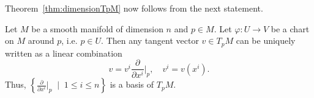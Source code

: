 Theorem~\ref{thm:dimensionTpM} now follows from the next statement.

\begin{proposition}\label{prop:basis_TpM}
	Let $M$ be a smooth manifold of dimension $n$ and $p\in M$.
	Let $\varphi: U \to V$ be a chart on $M$ around $p$, i.e. $p\in U$.
	Then any tangent vector $v\in T_p M$ can be uniquely written as a linear combination
	\begin{equation}
		v = v^i \frac{\partial}{\partial x^i}\Big|_p, \quad v^i = v(x^i).
	\end{equation}
	Thus, $\left\{\frac{\partial}{\partial x^i}\Big|_p\;\mid\; 1\leq i\leq n\right\}$ is a basis of $T_p M$.
\end{proposition}
